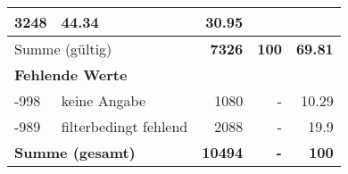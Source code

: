 \begin{longtable}{lXrrr}
       \num{3248} &
       \num[round-mode=places,round-precision=2]{44.34} &
         \num[round-mode=places,round-precision=2]{30.95} \\
     \midrule
     \multicolumn{2}{l}{Summe (gültig)} &
       \textbf{\num{7326}} &
     \textbf{\num{100}} &
       \textbf{\num[round-mode=places,round-precision=2]{69.81}} \\
     \multicolumn{5}{l}{\textbf{Fehlende Werte}}\\
       -998 &
       keine Angabe &
         \num{1080} &
        - &
         \num[round-mode=places,round-precision=2]{10.29} \\
       -989 &
       filterbedingt fehlend &
         \num{2088} &
        - &
         \num[round-mode=places,round-precision=2]{19.9} \\
     \midrule
     \multicolumn{2}{l}{\textbf{Summe (gesamt)}} &
          \textbf{\num{10494}} &
        \textbf{-} &
        \textbf{\num{100}} \\
     \bottomrule
     \end{longtable}
     
